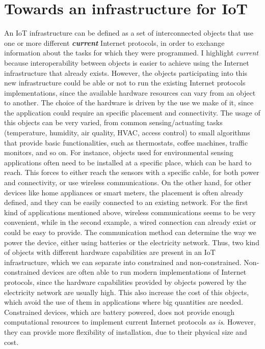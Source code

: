 \section{Towards an infrastructure for IoT}
An IoT infrastructure can be defined as a set of interconnected objects that use one or more different \textit{\textbf{current}} Internet protocols, in order to exchange information about the tasks for which they were programmed.
I highlight \textit{current} because interoperability between objects is easier to achieve using the Internet infrastructure that already exists.
However, the objects participating into this new infrastructure could be able or not to run the existing Internet protocols implementations, since the available hardware resources can vary from an object to another.
The choice of the hardware is driven by the use we make of it, since the application could require an specific placement and connectivity.
The usage of this objects can be very varied, from common sensing/actuating tasks (temperature, humidity, air quality, HVAC, access control) to small algorithms that provide basic functionalities, such as thermostats, coffee machines, traffic monitors, and so on.
For instance, objects used for environmental sensing applications often need to be installed at a specific place, which can be hard to reach. 
This forces to either reach the sensors with a specific cable, for both power and connectivity, or use wireless communications.
On the other hand, for other devices like home appliances or smart meters, the placement is often already defined, and they can be easily connected to an existing network.
For the first kind of applications mentioned above, wireless communications seems to be very convenient, while in the second example, a wired connection can already exist or could be easy to provide.
The communication method can determine the way we power the device, either using batteries or the electricity network.
Thus, two kind of objects with different hardware capabilities are present in an IoT infrastructure, which we can separate into constrained and non-constrained.
Non-constrained devices are often able to run modern implementations of Internet protocols, since the hardware capabilities provided by objects powered by the electricity network are usually high.
This also increase the cost of this objects, which avoid the use of them in applications where big quantities are needed.
Constrained devices, which are battery powered, does not provide enough computational resources to implement current Internet protocols \textit{as is}.
However, they can provide more flexibility of installation, due to their physical size and cost.

